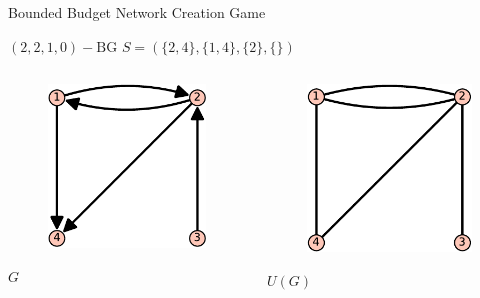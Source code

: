 \documentclass[aspectratio=169,handout]{beamer}
\begin{document}
\begin{frame}{Bounded Budget Network Creation Game}
    
    
    \begin{center}
    $(2,2,1,0)-\text{BG}$ \qquad $S = (\{2,4\},\{1,4\},\{2\},\{\})$
    \end{center}

    \vspace{1em}

    \begin{columns}
        \begin{column}{0.5\textwidth}
        \centering
        \begin{figure}
        \includegraphics[scale=0.75]{digraph-crop}
        \end{figure}
        \vspace{-1em}
        {\large $G$}
        \end{column}
        
        \begin{column}{0.5\textwidth}
        \centering
        \begin{figure}
        \includegraphics[scale=0.75]{u-crop}
        \end{figure}
        \vspace{-1em}
        {\large $U(G)$}
        \end{column}
    \end{columns}    
    
\end{frame}
\end{document}
